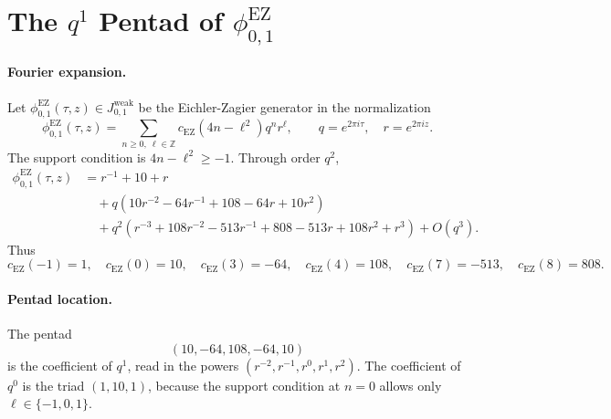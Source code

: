
\providecommand{\kBKM}{\kappa_{\mathrm{BKM}}}
\providecommand{\kch}{\kappa_{\mathrm{ch}}}
\providecommand{\kcat}{\kappa_{\mathrm{cat}}}
\providecommand{\kfib}{\kappa_{\mathrm{fiber}}}
\providecommand{\phiEZ}{\phi_{0,1}^{\mathrm{EZ}}}
\providecommand{\phiKthree}{\phi_{0,1}^{K3}}
\providecommand{\Dfive}{D_5}
\providecommand{\DeltaFive}{\Delta_5}
\providecommand{\PhiTen}{\Phi_{10}}
\providecommand{\Z}{\mathbb{Z}}
\providecommand{\C}{\mathbb{C}}

\section*{The $q^1$ Pentad of $\phi_{0,1}^{\mathrm{EZ}}$}

\paragraph{Fourier expansion.}
Let $\phiEZ(\tau,z)\in J^{\mathrm{weak}}_{0,1}$ be the
Eichler-Zagier generator in the normalization
\[
  \phiEZ(\tau,z)
  = \sum_{n\ge 0,\ \ell\in\Z}c_{\mathrm{EZ}}(4n-\ell^2)q^n r^\ell,
  \qquad q=e^{2\pi i\tau},\quad r=e^{2\pi iz}.
\]
The support condition is $4n-\ell^2\ge -1$. Through order $q^2$,
\[
\begin{aligned}
\phiEZ(\tau,z)
&=
  r^{-1}+10+r \\
&\quad
  +q(10r^{-2}-64r^{-1}+108-64r+10r^2)\\
&\quad
  +q^2(r^{-3}+108r^{-2}-513r^{-1}
       +808-513r+108r^2+r^3)
  +O(q^3).
\end{aligned}
\]
Thus
\[
 c_{\mathrm{EZ}}(-1)=1,\quad c_{\mathrm{EZ}}(0)=10,\quad
 c_{\mathrm{EZ}}(3)=-64,\quad c_{\mathrm{EZ}}(4)=108,\quad
 c_{\mathrm{EZ}}(7)=-513,\quad c_{\mathrm{EZ}}(8)=808.
\]

\paragraph{Pentad location.}
The pentad
\[
  (10,-64,108,-64,10)
\]
is the coefficient of $q^1$, read in the powers
$(r^{-2},r^{-1},r^0,r^1,r^2)$. The coefficient of $q^0$ is the triad
$(1,10,1)$, because the support condition at $n=0$ allows only
$\ell\in\{-1,0,1\}$.

